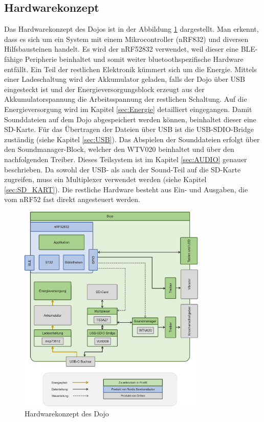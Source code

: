 \subsection{Hardwarekonzept}
  Das Hardwarekonzept des Dojos ist in der Abbildung \ref{fig:HWKonzept} dargestellt. 
  Man erkennt, dass es sich um ein System mit einem Mikrocontroller (nRF832) und diversen Hilfsbausteinen handelt. Es wird der nRF52832 verwendet, weil dieser eine BLE-fähige Peripherie beinhaltet und somit weiter bluetoothspezifische Hardware entfällt. 
  Ein Teil der restlichen Elektronik kümmert sich um die Energie. Mittels einer Ladeschaltung wird der Akkumulator geladen, falls der Dojo über USB eingesteckt ist und der Energieversorgungsblock erzeugt aus der Akkumulatorspannung die Arbeitsspannung der restlichen Schaltung. Auf die Energieversorgung wird im Kapitel \ref{sec:Energie} detailliert eingegangen.
  Damit Sounddateien auf dem Dojo abgespeichert werden können, beinhaltet dieser eine SD-Karte. Für das Übertragen der Dateien über USB ist die USB-SDIO-Bridge zuständig (siehe Kapitel \ref{sec:USB}).
  Das Abspielen der Sounddateien erfolgt über den Soundmanager-Block, welcher den WTV020 beinhaltet und über den nachfolgenden Treiber. Dieses Teilsystem ist im Kapitel \ref{sec:AUDIO} genauer beschrieben.
  Da sowohl der USB- als auch der Sound-Teil auf die SD-Karte zugreifen, muss ein Multiplexer verwendet werden (siehe Kapitel \ref{sec:SD_KART}). 
  Die restliche Hardware besteht aus Ein- und Ausgaben, die vom nRF52 fast direkt angesteuert werden.
  
  \begin{figure}[ht]
    \centering
    \includegraphics[width=0.8\textwidth]{graphics/Dojo.png}
    \caption{Hardwarekonzept des Dojo}
    \label{fig:HWKonzept}
  \end{figure}

